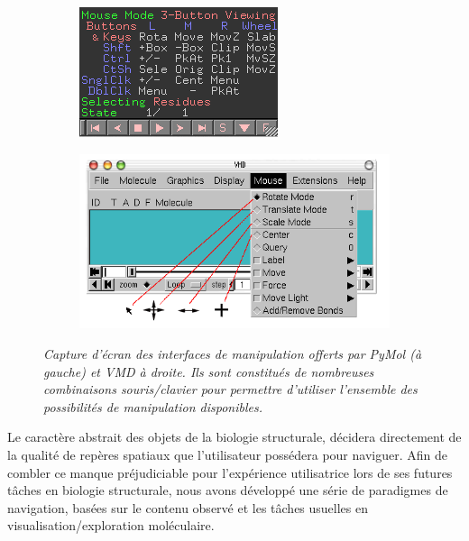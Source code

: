 \begin{figure}[h]
  \begin{subfigure}{.5\textwidth}
  \centering
  {\includegraphics[width=0.9\linewidth]{./figures/ch3/pymol_nav}}
  \caption{}
  \label{Fig:pymol_nav}
  \end{subfigure}
  \begin{subfigure}{.5\textwidth}
  \centering
  {\includegraphics[width=0.9\linewidth]{./figures/ch3/vmd_nav}}
  \hspace{0.3cm}
  \label{Fig:vmd_nav}
  \end{subfigure}
  \caption{\it Capture d'écran des interfaces de manipulation offerts par PyMol (à gauche) et VMD à droite. Ils sont constitués de nombreuses combinaisons souris/clavier pour permettre d'utiliser l'ensemble des possibilités de manipulation disponibles.
  }
\end{figure}


Le caractère abstrait des objets de la biologie structurale, décidera directement de la qualité de repères spatiaux que l'utilisateur possédera pour naviguer. Afin de combler ce manque préjudiciable pour l'expérience utilisatrice lors de ses futures tâches en biologie structurale, nous avons développé une série de paradigmes de navigation, basées sur le contenu observé et les tâches usuelles en visualisation/exploration moléculaire.


